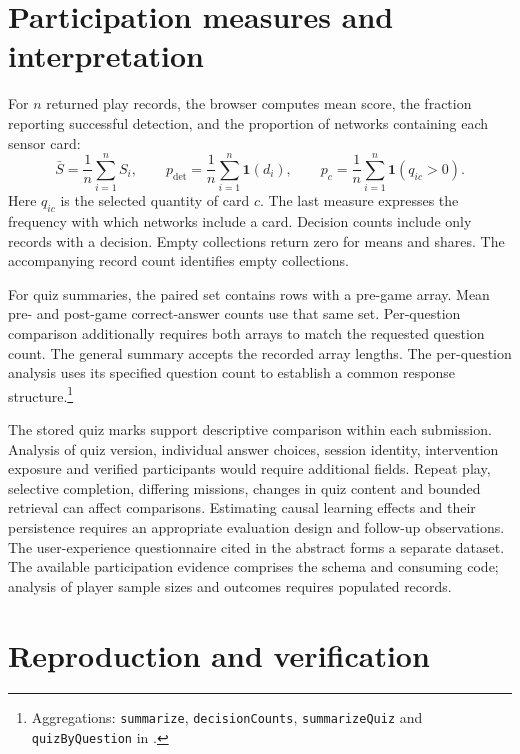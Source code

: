 \documentclass[10pt,a4paper]{article}
\begin{document}
\section{Participation measures and interpretation}
For $n$ returned play records, the browser computes mean score, the fraction reporting successful detection, and the proportion of networks containing each sensor card:
\begin{equation}
\bar S=\frac{1}{n}\sum_{i=1}^{n}S_i,\qquad
p_{\mathrm{det}}=\frac{1}{n}\sum_{i=1}^{n}\mathbf{1}(d_i),\qquad
p_c=\frac{1}{n}\sum_{i=1}^{n}\mathbf{1}(q_{ic}>0).
\end{equation}
Here $q_{ic}$ is the selected quantity of card $c$. The last measure expresses the frequency with which networks include a card. Decision counts include only records with a decision. Empty collections return zero for means and shares. The accompanying record count identifies empty collections.

For quiz summaries, the paired set contains rows with a pre-game array. Mean pre- and post-game correct-answer counts use that same set. Per-question comparison additionally requires both arrays to match the requested question count. The general summary accepts the recorded array lengths. The per-question analysis uses its specified question count to establish a common response structure.\footnote{Aggregations: \texttt{summarize}, \texttt{decisionCounts}, \texttt{summarizeQuiz} and \texttt{quizByQuestion} in .}

The stored quiz marks support descriptive comparison within each submission. Analysis of quiz version, individual answer choices, session identity, intervention exposure and verified participants would require additional fields. Repeat play, selective completion, differing missions, changes in quiz content and bounded retrieval can affect comparisons. Estimating causal learning effects and their persistence requires an appropriate evaluation design and follow-up observations. The user-experience questionnaire cited in the abstract forms a separate dataset. The available participation evidence comprises the schema and consuming code; analysis of player sample sizes and outcomes requires populated records.

\section{Reproduction and verification}
\end{document}
